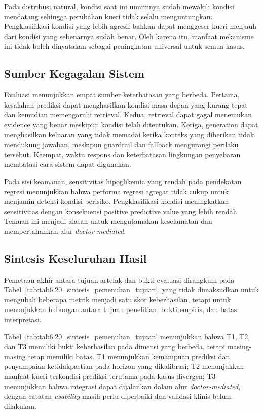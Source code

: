 Pada distribusi natural, kondisi saat ini umumnya sudah mewakili kondisi mendatang sehingga perubahan kueri tidak selalu menguntungkan. Pengklasifikasi
kondisi yang lebih agresif bahkan dapat menggeser kueri menjauh dari kondisi yang sebenarnya sudah benar. Oleh karena itu, manfaat mekanisme ini tidak
boleh dinyatakan sebagai peningkatan universal untuk semua kasus.

\subsection{Sumber Kegagalan Sistem}
\label{subsec:bab6-sumber-kegagalan-sistem}

Evaluasi menunjukkan empat sumber keterbatasan yang berbeda. Pertama, kesalahan prediksi dapat menghasilkan kondisi masa depan yang kurang tepat dan
kemudian memengaruhi retrieval. Kedua, retrieval dapat gagal menemukan evidence yang benar meskipun kondisi telah ditentukan. Ketiga, generation dapat
menghasilkan keluaran yang tidak memadai ketika konteks yang diberikan tidak mendukung jawaban, meskipun guardrail dan fallback mengurangi perilaku tersebut.
Keempat, waktu respons dan keterbatasan lingkungan penyebaran membatasi cara sistem dapat digunakan.

Pada sisi keamanan, sensitivitas hipoglikemia yang rendah pada pendekatan regresi menunjukkan bahwa performa regresi agregat tidak cukup untuk menjamin
deteksi kondisi berisiko. Pengklasifikasi kondisi meningkatkan sensitivitas dengan konsekuensi positive predictive value yang lebih rendah. Temuan ini
menjadi alasan untuk mengutamakan keselamatan dan mempertahankan alur \textit{doctor-mediated}.

\subsection{Sintesis Keseluruhan Hasil}
\label{subsec:bab6-sintesis-keseluruhan-hasil}

Pemetaan akhir antara tujuan artefak dan bukti evaluasi dirangkum pada Tabel~\ref{tab:tab6.20_sintesis_pemenuhan_tujuan}, yang tidak dimaksudkan
untuk mengubah beberapa metrik menjadi satu skor keberhasilan, tetapi untuk menunjukkan hubungan antara tujuan penelitian, bukti empiris, dan batas
interpretasi.



Tabel~\ref{tab:tab6.20_sintesis_pemenuhan_tujuan} menunjukkan bahwa T1, T2, dan T3 memiliki bukti keberhasilan pada dimensi yang berbeda, tetapi masing-masing
tetap memiliki batas. T1 menunjukkan kemampuan prediksi dan penyampaian ketidakpastian pada horizon yang dikalibrasi; T2 menunjukkan manfaat kueri terkondisi-prediksi
terutama pada kasus divergen; T3 menunjukkan bahwa integrasi dapat dijalankan dalam alur \textit{doctor-mediated}, dengan catatan \textit{usability}
masih perlu diperbaiki dan validasi klinis belum dilakukan.

